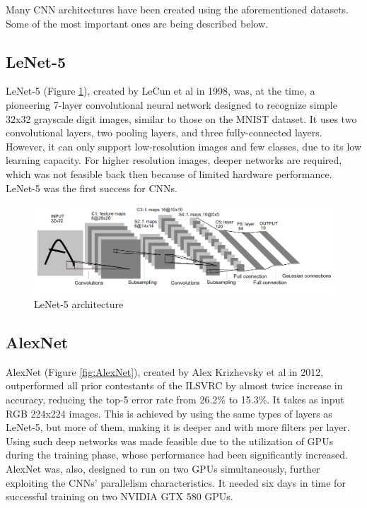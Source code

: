 Many CNN architectures have been created using the aforementioned data\-sets. Some of the most important ones are being described below.

\subsection{LeNet-5}
LeNet-5 \cite{Gradient-based-learning-applied-to-document-recognition} (Figure \ref{fig:LeNet-5}), created by LeCun et al in 1998, was, at the time, a pioneering 7-layer convolutional neural network designed to recognize simple 32x32 grayscale digit images, similar to those on the MNIST dataset. It uses two convolutional layers, two pooling layers, and three fully-connected layers. However, it can only support low-resolution images and few classes, due to its low learning capacity. For higher resolution images, deeper networks are required, which was not feasible back then because of limited hardware performance. LeNet-5 was the first success for CNNs.

\begin{figure} [H]
	\centering
	\includegraphics[width=\textwidth]{Images/CNNArchitectures/LeNet-5.png}
	\decoRule
	\caption[LeNet-5 architecture]{LeNet-5 architecture}
	\label{fig:LeNet-5}
\end{figure}

\subsection{AlexNet}
AlexNet \cite{ImageNet-classification-with-deep-convolutional-neural-networks} (Figure \ref{fig:AlexNet}), created by Alex Krizhevsky et al in 2012, outperformed all prior contestants of the ILSVRC by almost twice increase in accuracy, reducing the top-5 error rate from 26.2\% to 15.3\%. It takes as input RGB 224x224 images. This is achieved by using the same types of layers as LeNet-5, but more of them, making it is deeper and with more filters per layer. Using such deep networks was made feasible due to the utilization of GPUs during the training phase, whose performance had been significantly increased. AlexNet was, also, designed to run on two GPUs simultaneously, further exploiting the CNNs' parallelism characteristics. It needed six days in time for successful training on two NVIDIA GTX 580 GPUs.

